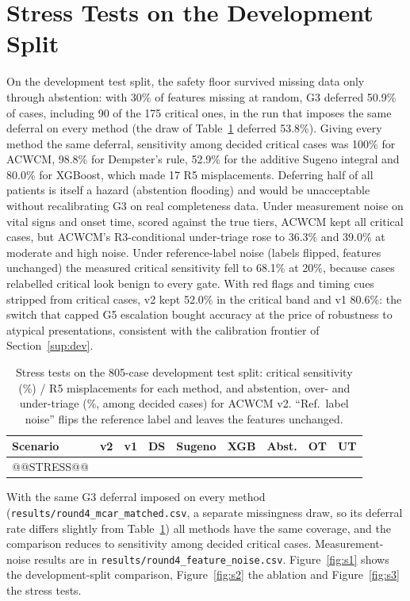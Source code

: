 \documentclass[11pt,a4paper]{article}%
\begin{document}
\section{Stress Tests on the Development Split}\label{sup:stress}

On the development test split, the safety floor survived missing data only through abstention: with 30\% of features missing at random, G3 deferred 50.9\% of cases, including 90 of the 175 critical ones, in the run that imposes the same deferral on every method (the draw of Table~\ref{tab:stress} deferred 53.8\%). Giving every method the same deferral, sensitivity among decided critical cases was 100\% for ACWCM, 98.8\% for Dempster's rule, 52.9\% for the additive Sugeno integral and 80.0\% for XGBoost, which made 17 R5 misplacements. Deferring half of all patients is itself a hazard (abstention flooding) and would be unacceptable without recalibrating G3 on real completeness data. Under measurement noise on vital signs and onset time, scored against the true tiers, ACWCM kept all critical cases, but ACWCM's R3-conditional under-triage rose to 36.3\% and 39.0\% at moderate and high noise. Under reference-label noise (labels flipped, features unchanged) the measured critical sensitivity fell to 68.1\% at 20\%, because cases relabelled critical look benign to every gate. With red flags and timing cues stripped from critical cases, v2 kept 52.0\% in the critical band and v1 80.6\%: the switch that capped G5 escalation bought accuracy at the price of robustness to atypical presentations, consistent with the calibration frontier of Section~\ref{sup:dev}.

\begin{table}[h]
\caption{Stress tests on the 805-case development test split: critical sensitivity (\%) / R5 misplacements for each method, and abstention, over- and under-triage (\%, among decided cases) for ACWCM v2. ``Ref.\ label noise'' flips the reference label and leaves the features unchanged.}\label{tab:stress}
\footnotesize\setlength{\tabcolsep}{3pt}
\begin{tabular}{@{}lrrrrrrrr@{}}
\toprule
Scenario & v2 & v1 & DS & Sugeno & XGB & Abst. & OT & UT \\
\midrule
@@STRESS@@
\bottomrule
\end{tabular}
\end{table}

With the same G3 deferral imposed on every method (\texttt{results/round4\_mcar\_matched.csv}, a separate missingness draw, so its deferral rate differs slightly from Table~\ref{tab:stress}) all methods have the same coverage, and the comparison reduces to sensitivity among decided critical cases. Measurement-noise results are in \texttt{results/round4\_feature\_noise.csv}. Figure~\ref{fig:s1} shows the development-split comparison, Figure~\ref{fig:s2} the ablation and Figure~\ref{fig:s3} the stress tests.
\end{document}
